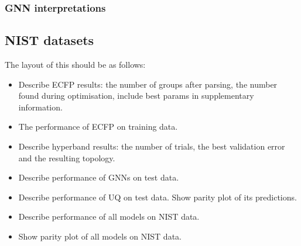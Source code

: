 \subsubsection{GNN interpretations}

\subsection{NIST datasets}

The layout of this should be as follows:
\begin{itemize}
    \item Describe ECFP results: the number of groups after parsing, the number found during optimisation, include best params in supplementary information.
    \item The performance of ECFP on training data.
    \item Describe hyperband results: the number of trials, the best validation error and the resulting topology.
    \item Describe performance of GNNs on test data.
    \item Describe performance of UQ on test data. Show parity plot of its predictions.
    \item Describe performance of all models on NIST data.
    \item Show parity plot of all models on NIST data.
\end{itemize}